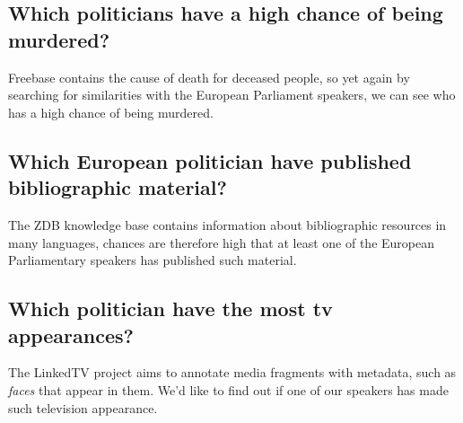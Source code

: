 \documentclass[11pt,a4paper]{article}
\begin{document}
\subsection{Which politicians have a high chance of being murdered?}

Freebase contains the cause of death for deceased people, so yet again by searching for similarities with the European Parliament speakers, we can see who has a high chance of being murdered.

\subsection{Which European politician have published bibliographic material?}

The ZDB knowledge base contains information about bibliographic resources in many languages, chances are therefore high that at least one of the European Parliamentary speakers has published such material.

\subsection{Which politician have the most tv appearances?}

The LinkedTV project aims to annotate media fragments with metadata, such as \emph{faces} that appear in them. We'd like to find out if one of our speakers has made such television appearance.
\end{document}
